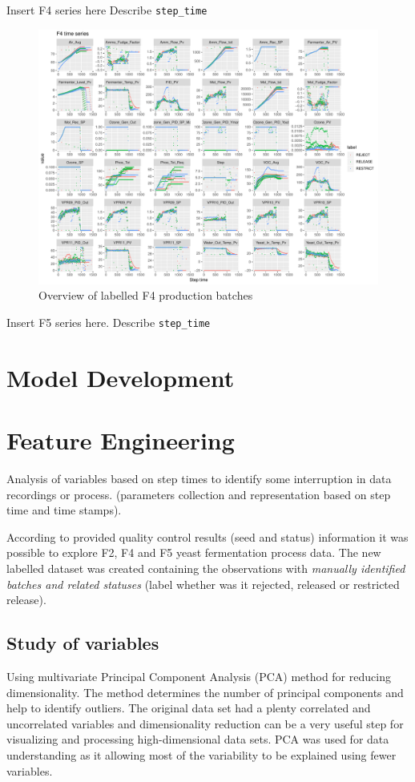 \documentclass{article}
\begin{document}
Insert F4 series here
Describe \texttt{step\_time}
\begin{figure}
    \centering
    \includegraphics[width=1.0\textwidth]{f4_plot}
    \caption{Overview of labelled F4 production batches}
    \label{fig:f4series}
\end{figure}


Insert F5 series here.
Describe \texttt{step\_time}

\section{Model Development}
\lipsum[1]

\section{Feature Engineering}
Analysis of variables based on step times to identify some interruption in data recordings or process.  (parameters collection and representation based on step time and time stamps).

According to provided quality control results (seed and status) information it was possible to explore F2, F4 and F5 yeast fermentation process data. The new labelled dataset was created containing the observations with \emph{manually identified batches and related statuses} (label whether was it rejected, released or restricted release).

\subsection{Study of variables}
Using multivariate Principal Component Analysis (PCA) method for reducing dimensionality. The method determines the number of principal components and help to identify outliers. The original data set had a plenty correlated and uncorrelated variables and dimensionality reduction can be a very useful step for visualizing and processing high-dimensional data sets.  PCA was used for data understanding as it allowing most of the variability to be explained using fewer variables.
\end{document}
